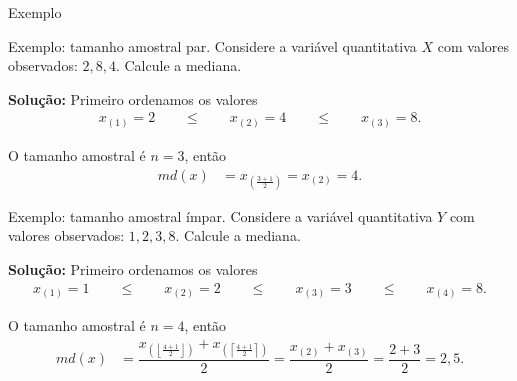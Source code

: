 \documentclass[8pt]{beamer}
\begin{document}
\begin{frame}{Exemplo}

{\small
  \begin{block}{Exemplo: tamanho amostral par.}
   Considere a variável quantitativa $X$ com valores observados: $2,8,4$. Calcule a mediana.
   
   \textbf{Solução:} Primeiro ordenamos os valores
   \begin{align*}
    x_{(1)} = 2 \qquad \leq \qquad x_{(2)}=4  \qquad \leq \qquad x_{(3)}=8.
   \end{align*}
  
  O tamanho amostral é $n=3$, então
  \begin{align*}
   md(x) &= x_{\left( \frac{3+1}{2} \right)} = x_{(2)} = 4.
  \end{align*}
  \end{block}
  
    \begin{block}{Exemplo: tamanho amostral ímpar.}
   Considere a variável quantitativa $Y$ com valores observados: $1,2,3,8$. Calcule a mediana.
   
   \textbf{Solução:} Primeiro ordenamos os valores
   \begin{align*}
    x_{(1)} = 1 \qquad \leq \qquad x_{(2)}=2  \qquad \leq \qquad x_{(3)}=3 \qquad \leq \qquad x_{(4)}=8.
   \end{align*}
  
  O tamanho amostral é $n=4$, então
  \begin{align*}
   md(x) &= \dfrac{ x_{\left( \left\lfloor \frac{4+1}{2} \right\rfloor \right)} + x_{\left( \left\lceil \frac{4+1}{2} \right\rceil \right)} }{2} = \dfrac{x_{(2)} + x_{(3)} }{2}=\dfrac{2+3}{2} = 2,5.
  \end{align*}
  \end{block}

}

\end{frame}
\end{document}
